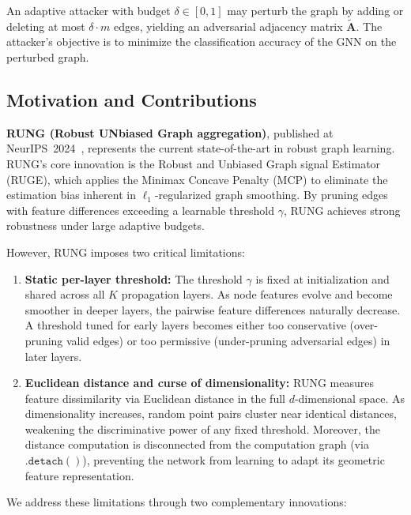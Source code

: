 \documentclass[sigconf]{acmart}
\begin{document}
An adaptive attacker with budget $\delta \in [0, 1]$ may perturb the graph by adding or deleting at most $\delta \cdot m$ edges, yielding an adversarial adjacency matrix $\tilde{\mathbf{A}}$. The attacker's objective is to minimize the classification accuracy of the GNN on the perturbed graph.

\subsection{Motivation and Contributions}

\textbf{RUNG (Robust UNbiased Graph aggregation)}, published at NeurIPS~2024~\cite{hou2024rung}, represents the current state-of-the-art in robust graph learning. RUNG's core innovation is the Robust and Unbiased Graph signal Estimator (RUGE), which applies the Minimax Concave Penalty (MCP) to eliminate the estimation bias inherent in $\ell_1$-regularized graph smoothing. By pruning edges with feature differences exceeding a learnable threshold $\gamma$, RUNG achieves strong robustness under large adaptive budgets.

However, RUNG imposes two critical limitations:

\begin{enumerate}
\item \textbf{Static per-layer threshold:} The threshold $\gamma$ is fixed at initialization and shared across all $K$ propagation layers. As node features evolve and become smoother in deeper layers, the pairwise feature differences naturally decrease. A threshold tuned for early layers becomes either too conservative (over-pruning valid edges) or too permissive (under-pruning adversarial edges) in later layers.

\item \textbf{Euclidean distance and curse of dimensionality:} RUNG measures feature dissimilarity via Euclidean distance in the full $d$-dimensional space. As dimensionality increases, random point pairs cluster near identical distances, weakening the discriminative power of any fixed threshold. Moreover, the distance computation is disconnected from the computation graph (via $\mathtt{.detach()}$), preventing the network from learning to adapt its geometric feature representation.
\end{enumerate}

We address these limitations through two complementary innovations:
\end{document}
